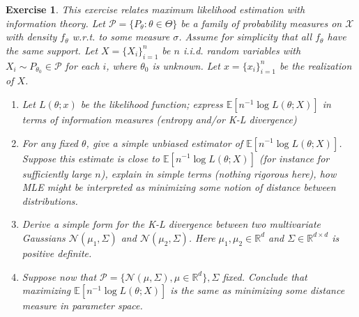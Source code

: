 \documentclass[12pt]{article}
\theoremstyle{colon}
\newtheorem{exercise}{Exercise}
\begin{document}
\begin{exercise}
  This exercise relates maximum likelihood estimation with information theory. Let $\mathcal{P} = \{ P_\theta: \theta \in \Theta \}$ be a family of probability measures on $\mathcal{X}$ with density $f_\theta$ w.r.t. to some measure $\sigma$. Assume for simplicity that all $f_\theta$ have the same support. Let $X = \{ X_i \}_{i=1}^n$ be $n$ i.i.d. random variables with $X_i \sim P_{\theta_0} \in \mathcal{P}$ for each $i$, where $\theta_0$ is unknown. Let $x = \{ x_i \}_{i=1}^n$ be the realization of $X$.
  \begin{enumerate}[label=\arabic*)]
    \item Let $L(\theta; x)$ be the likelihood function; express $\mathbb{E}[n^{-1} \log L(\theta; X)]$ in terms of information measures (entropy and/or K-L divergence)
    \item For any fixed $\theta$, give a simple unbiased estimator of $\mathbb{E}[n^{-1} \log L(\theta; X)]$. Suppose this estimate is close to $\mathbb{E}[n^{-1} \log L(\theta; X)]$ (for instance for sufficiently large $n$), explain in simple terms (nothing rigorous here), how MLE might be interpreted as minimizing some notion of distance between distributions.
    \item Derive a simple form for the K-L divergence between two multivariate Gaussians $\mathcal{N}(\mu_1, \Sigma)$ and $\mathcal{N}(\mu_2, \Sigma)$. Here $\mu_1, \mu_2 \in \mathbb{R}^d$ and $\Sigma \in \mathbb{R}^{d \times d}$ is positive definite.
    \item Suppose now that $\mathcal{P} = \{ \mathcal{N}(\mu, \Sigma), \mu \in \mathbb{R}^d \}, \Sigma$ fixed. Conclude that maximizing $\mathbb{E}[n^{-1} \log L(\theta; X)]$ is the same as minimizing some distance measure in parameter space.
  \end{enumerate}
\end{exercise}
\end{document}
